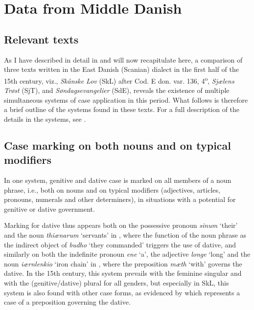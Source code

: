 \documentclass[output=paper]{langsci/langscibook}
\begin{document}
\section{Data from Middle Danish} \label{hansen:2}
\subsection{Relevant texts} \label{hansen:2.1}

As I have described in detail in \citet[282--289]{Hansen2021} and will now recapitulate here, a comparison of three texts written in the East Danish (Scanian) dialect in the first half of the 15th century, viz., \textit{Skånske Lov} (SkL) after Cod. E don. var. 136, 4\textsuperscript{o}, \textit{Sjælens Trøst} (SjT), and \textit{Søndagsevangelier} (SdE), reveals the existence of multiple simultaneous systems of case application in this period. What follows is therefore a brief outline of the systems found in these texts. For a full description of the details in the systems, see \citet[282--289]{Hansen2021}.

\subsection{Case marking on both nouns and on typical modifiers} \label{hansen:2.2}

In one system, genitive and dative case is marked on all members of a noun phrase, i.e., both on nouns and on typical modifiers (adjectives, articles, pronouns, numerals and other determiners), in situations with a potential for genitive or dative government.

Marking for dative thus appears both on the possessive pronoun \textit{sinum} ‘their’ and the noun \textit{thiænarum} ‘servants’ in , where the function of the noun phrase as the indirect object of \textit{budho} ‘they commanded’ triggers the use of dative, and similarly on both the indefinite pronoun \textit{ene} ‘a’, the adjective \textit{longe} ‘long’ and the noun \textit{iærnlenkio} ‘iron chain’ in , where the preposition \textit{mæth} ‘with’ governs the dative. In the 15th century, this system prevails with the feminine singular and with the (genitive/dative) plural for all genders, but especially in SkL, this system is also found with other case forms, as evidenced by  which represents a case of a preposition governing the dative.
\end{document}
